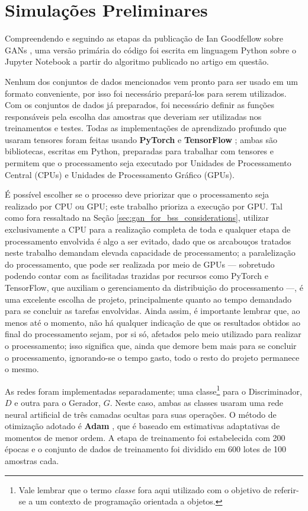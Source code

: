 \section{Simulações Preliminares}
\label{sec:results_preliminary_simulations}

Compreendendo e seguindo as etapas da publicação de Ian Goodfellow sobre GANs \citep{NIPS2014_5423}, uma versão primária do código foi escrita em linguagem Python sobre o Jupyter Notebook a partir do algoritmo publicado no artigo em questão.

Nenhum dos conjuntos de dados mencionados vem pronto para ser usado em um formato conveniente, por isso foi necessário prepará-los para serem utilizados. Com os conjuntos de dados já preparados, foi necessário definir as funções responsáveis pela escolha das amostras que deveriam ser utilizadas nos treinamentos e testes. Todas as implementações de aprendizado profundo que usaram tensores foram feitas usando \textbf{PyTorch} \citep{paszke2017pytorch} e \textbf{TensorFlow} \citep{abadi2016tensorflow}; ambas são bibliotecas, escritas em Python, preparadas para trabalhar com tensores e permitem que o processamento seja executado por Unidades de Processamento Central (CPUs) e Unidades de Processamento Gráfico (GPUs).

É possível escolher se o processo deve priorizar que o processamento seja realizado por CPU ou GPU; este trabalho prioriza a execução por GPU. Tal como fora ressaltado na Seção \ref{sec:gan_for_bss_considerations}, utilizar exclusivamente a CPU para a realização completa de toda e qualquer etapa de processamento envolvida é algo a ser evitado, dado que os arcabouços tratados neste trabalho demandam elevada capacidade de processamento; a paralelização do processamento, que pode ser realizada por meio de GPUs --- sobretudo podendo contar com as facilitadas trazidas por recursos como PyTorch e TensorFlow, que auxiliam o gerenciamento da distribuição do processamento ---, é uma excelente escolha de projeto, principalmente quanto ao tempo demandado para se concluir as tarefas envolvidas. Ainda assim, é importante lembrar que, ao menos até o momento, não há qualquer indicação de que os resultados obtidos ao final do processamento sejam, por si só, afetados pelo meio utilizado para realizar o processamento; isso significa que, ainda que demore bem mais para se concluir o processamento, ignorando-se o tempo gasto, todo o resto do projeto permanece o mesmo.

As redes foram implementadas separadamente; uma classe\footnote{Vale lembrar que o termo \textit{classe} fora aqui utilizado com o objetivo de referir-se a um contexto de programação orientada a objetos.} para o Discriminador, $D$ e outra para o Gerador, $G$. Neste caso, ambas as classes usaram uma rede neural artificial de três camadas ocultas para suas operações. O método de otimização adotado é \textbf{Adam} \citep{kingma2014adam}, que é baseado em estimativas adaptativas de momentos de menor ordem. A etapa de treinamento foi estabelecida com 200 épocas e o conjunto de dados de treinamento foi dividido em 600 lotes de 100 amostras cada.

